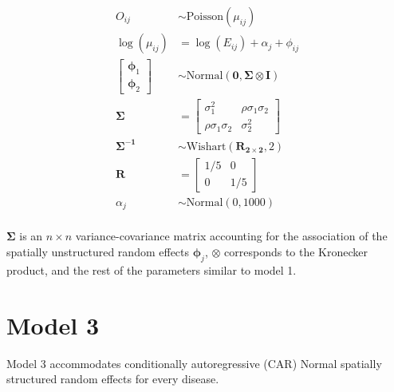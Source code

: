 \documentclass[10pt,letterpaper]{article}
\begin{document}
\begin{align*}
O_{ij}                    &\sim   \mbox{Poisson}(\mu_{ij})\\
\log(\mu_{ij})            &=      \log(E_{ij}) + \alpha_{j} + \phi_{ij}\\ 
\begin{bmatrix}
\boldsymbol{\phi}_{1}\\
\boldsymbol{\phi}_{2}
\end{bmatrix}              &\sim   \mbox{Normal}(\boldsymbol{0}, \boldsymbol{\Sigma}\otimes \mathbf{I})\\
\boldsymbol{\Sigma}        &= 
\begin{bmatrix}
\sigma^{2}_{1}             & \rho \sigma_{1} \sigma_{2}\\
\rho \sigma_{1} \sigma_{2} & \sigma^{2}_{2}             
\end{bmatrix}\\
\boldsymbol{\Sigma^{-1}}   &\sim   \mbox{Wishart}(\mathbf{R_{2\times2}},2)\\
\boldsymbol{R}             &= 
\begin{bmatrix}
1/5      &  0        \\
0        &  1/5             
\end{bmatrix}\\
\alpha_{j}                 &\sim   \mbox{Normal}(0,1000)\\
\end{align*}

$\mathbf{\Sigma}$ is an $n \times n$ variance-covariance matrix accounting for the association of the spatially unstructured random effects $\boldsymbol{\phi}_{j}$, $\otimes$ corresponds to the Kronecker product, and the rest of the parameters similar to model 1.

\newpage

\section*{Model 3}
Model 3 accommodates conditionally autoregressive (CAR) \cite{Besag1991} Normal spatially structured random effects for every disease.
\end{document}
